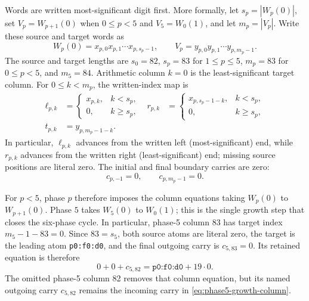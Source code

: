 \documentclass[11pt,twoside]{article}
\theoremstyle{remark}
\begin{document}
Words are written most-significant digit first.  More formally, let
$s_p=|W_p(0)|$, set $V_p=W_{p+1}(0)$ when $0\leq p<5$ and
$V_5=W_0(1)$, and let $m_p=|V_p|$.  Write these source and target words as
\[
  W_p(0)=x_{p,0}x_{p,1}\cdots x_{p,s_p-1},
  \qquad
  V_p=y_{p,0}y_{p,1}\cdots y_{p,m_p-1}.
\]
The source and target lengths are $s_0=82$, $s_p=83$ for
$1\leq p\leq5$, $m_p=83$ for
$0\leq p<5$, and $m_5=84$.  Arithmetic column $k=0$ is the
least-significant target column.  For $0\leq k<m_p$, the written-index map is
\begin{align}
  \ell_{p,k}
    &=\begin{cases}
        x_{p,k}, & k<s_p,\\
        0, & k\geq s_p,
      \end{cases}
  &
  r_{p,k}
    &=\begin{cases}
        x_{p,s_p-1-k}, & k<s_p,\\
        0, & k\geq s_p,
      \end{cases}
  \label{eq:source-index-map}\\
  t_{p,k}&=y_{p,m_p-1-k}.&&
  \label{eq:target-index-map}
\end{align}
In particular, $\ell_{p,k}$ advances from the written left (most-significant)
end, while $r_{p,k}$ advances from the written right (least-significant) end;
missing source positions are literal zero.  The initial and final boundary
carries are zero:
\begin{equation}
  c_{p,-1}=0,
  \qquad
  c_{p,m_p-1}=0.
  \label{eq:carry-boundaries}
\end{equation}

For $p<5$, phase $p$ therefore imposes the column equations taking $W_p(0)$
to $W_{p+1}(0)$.  Phase $5$ takes $W_5(0)$ to $W_0(1)$; this is the single
growth step that closes the six-phase cycle.  In particular, phase-5 column
83 has target index $m_5-1-83=0$.  Since $83=s_5$, both source atoms are
literal zero, the target is the leading atom \texttt{p0:f0:d0}, and the final
outgoing carry is $c_{5,83}=0$.  Its retained equation is therefore
\begin{equation}
  0+0+c_{5,82}=\texttt{p0:f0:d0}+19\cdot0.
  \label{eq:phase5-growth-column}
\end{equation}
The omitted phase-5 column 82 removes that column equation, but its named
outgoing carry $c_{5,82}$ remains the incoming carry in
\cref{eq:phase5-growth-column}.
\end{document}
